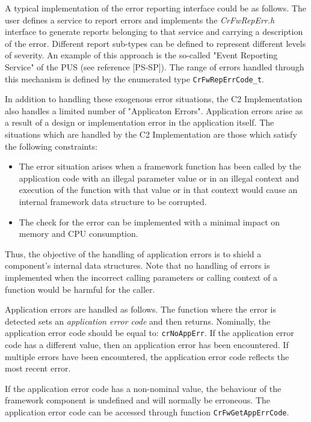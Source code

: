 \documentclass{pnp_article}
\begin{document}
A typical implementation of the error reporting interface could be as follows. The user defines a service to report errors and implements the \textit{CrFwRepErr.h} interface to generate reports belonging to that service and carrying a description of the error. Different report sub-types can be defined to represent different levels of severity. An example of this approach is the so-called "Event Reporting Service" of the PUS (see reference [PS-SP]). The range of errors handled through this mechanism is defined by the enumerated type \texttt{CrFwRepErrCode\_t}.

In addition to handling these exogenous error situations, the C2 Implementation also handles a limited number of "Applicaton Errors". Application errors arise as a result of a design or implementation error in the application itself. The situations which are handled by the C2 Implementation are those which satisfy the following constraints:

\begin{itemize}
\item The error situation arises when a framework function has been called by the application code with an illegal parameter value or in an illegal context and execution of the function with that value or in that context would cause an internal framework data structure to be corrupted.
\item The check for the error can be implemented with a minimal impact on memory and CPU consumption.
\end{itemize}

Thus, the objective of the handling of application errors is to shield a component's internal data structures. Note that no handling of errors is implemented when the incorrect calling parameters or calling context of a function would be harmful for the caller. 

Application errors are handled as follows. The function where the error is detected sets an \textit{application error code} and then returns. Nominally, the application error code should be equal to: \texttt{crNoAppErr}. If the application error code has a different value, then an application error has been encountered. If multiple errors have been encountered, the application error code reflects the most recent error.

If the application error code has a non-nominal value, the behaviour of the framework component is undefined and will normally be erroneous. The application error code can be accessed through function \texttt{CrFwGetAppErrCode}. 
\end{document}

